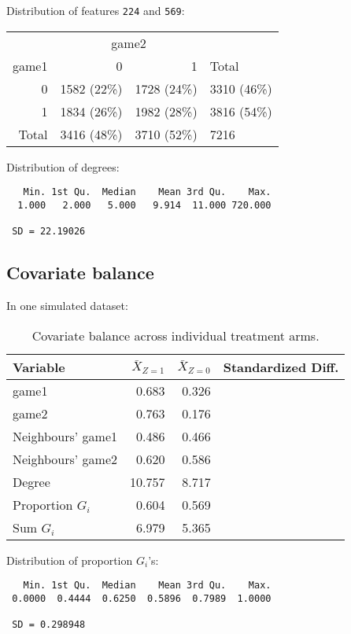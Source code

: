 \documentclass[10pt]{article}
\begin{document}
\todo

Distribution of features \verb|224| and \verb|569|:

\begin{table}[H]
\centering
\begin{tabular}{@{}rrrl@{}}
\toprule
& \multicolumn{2}{c}{game2} \\
\cmidrule(lr){2-3}
game1 & 0 & 1 & Total \\
\midrule
0 & 1582 (22\%) & 1728 (24\%) & 3310 (46\%) \\
1 & 1834 (26\%) & 1982 (28\%) & 3816 (54\%) \\
Total & 3416 (48\%) & 3710 (52\%) & 7216 \\
\bottomrule
\end{tabular}
\end{table}

Distribution of degrees:
\begin{verbatim}
   Min. 1st Qu.  Median    Mean 3rd Qu.    Max. 
  1.000   2.000   5.000   9.914  11.000 720.000
  
 SD = 22.19026
\end{verbatim}

\subsection{Covariate balance} \label{apx:covbal}

In one simulated dataset:

\begin{table}[H]
\centering
\begin{tabular}{@{}lrrr@{}}
\toprule
Variable & $\bar{X}_{Z=1}$ & $\bar{X}_{Z=0}$ & Standardized Diff. \\
\midrule
game1 & 0.683 & 0.326 &  \\
game2 & 0.763 & 0.176 &  \\
Neighbours' game1 & 0.486 & 0.466 & \\
Neighbours' game2 & 0.620 & 0.586 & \\
Degree & 10.757 & 8.717 & \\
Proportion $G_i$ & 0.604 & 0.569 & \\
Sum $G_i$ & 6.979 & 5.365 & \\
\bottomrule
\end{tabular}
\caption{Covariate balance across individual treatment arms.}
\end{table}

Distribution of proportion $G_i$'s:
\begin{verbatim}
   Min. 1st Qu.  Median    Mean 3rd Qu.    Max. 
 0.0000  0.4444  0.6250  0.5896  0.7989  1.0000
 
 SD = 0.298948
\end{verbatim}
\end{document}
